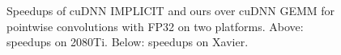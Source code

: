 \begin{table}[]
\begin{threeparttable}
\begin{tabular}{lrrrrrrrrrr }
\bottomrule
\end{tabular}
\end{threeparttable}
\end{table}




\begin{figure}
\captionsetup[subfloat]{labelformat=empty,skip=0pt}
	\centering
\vspace{-5mm}
	\vspace{-6mm}
	\caption{Speedups of cuDNN IMPLICIT and ours over cuDNN GEMM for pointwise convolutions with FP32 on two platforms. Above: speedups on 2080Ti. Below: speedups on Xavier.}
	\label{fig:pwspeedupfp32}
\end{figure}

